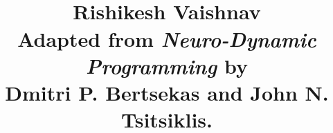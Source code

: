 


\title{
\\
\vspace{10pt}
\large 
Rishikesh Vaishnav\\ 
\vspace{10pt}
\normalsize 
Adapted from
{\it Neuro-Dynamic Programming}
by \\
Dmitri P. Bertsekas
and
John N. Tsitsiklis.
}
\maketitle


